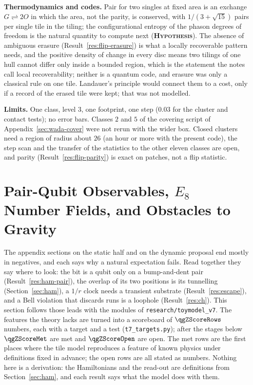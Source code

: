 \documentclass[11pt]{article}
\newcommand{\hypo}{\textbf{\textsc{Hypothesis}}}
\theoremstyle{definition}
\begin{document}
\textbf{Thermodynamics and codes.} Pair for two singles at fixed area is an exchange $G\rightleftharpoons 2O$ in which the area, not the parity, is conserved, with $1/(3+\sqrt{15})$ pairs per single tile in the tiling; the configurational entropy of the phason degrees of freedom is the natural quantity to compute next (\hypo). The absence of ambiguous erasure (Result~\ref{res:flip-erasure}) is what a locally recoverable pattern needs, and the positive density of change in every disc means two tilings of one hull cannot differ only inside a bounded region, which is the statement the notes call local recoverability; neither is a quantum code, and erasure was only a classical rule on one tile. Landauer's principle \cite{landauer1961} would connect them to a cost, only if a record of the erased tile were kept; that was not modelled.

\textbf{Limits.} One class, level $3$, one footprint, one step ($0.03$ for the cluster and contact tests); no error bars. Classes $2$ and $5$ of the covering script of Appendix~\ref{sec:wada-cover} were not rerun with the wider box. Closed clusters need a region of radius about $26$ (an hour or more with the present code), the step scan and the transfer of the statistics to the other eleven classes are open, and parity (Result~\ref{res:flip-parity}) is exact on patches, not a flip statistic.


\section{Pair-Qubit Observables, $E_8$ Number Fields, and Obstacles to Gravity}
\label{sec:toward}

The appendix sections on the static half and on the dynamic proposal end mostly in negatives, and each says why a natural expectation fails. Read together they say where to look: the bit is a qubit only on a bump-and-dent pair (Result~\ref{res:ham-pair}), the overlap of its two positions is its tunnelling (Section~\ref{sec:ham}), a $1/r$ clock needs a transient substrate (Result~\ref{res:escape}), and a Bell violation that discards runs is a loophole (Result~\ref{res:ch}). This section follows those leads with the modules of \texttt{research/toymodel\_v7}. The features the theory lacks are turned into a scoreboard of $\qgZScoreRows$ numbers, each with a target and a test (\texttt{t7\_targets.py}); after the stages below $\qgZScoreMet$ are met and $\qgZScoreOpen$ are open. The met rows are the first places where the tile model reproduces a feature of known physics under definitions fixed in advance; the open rows are all stated as numbers. Nothing here is a derivation: the Hamiltonians and the read-out are definitions from Section~\ref{sec:ham}, and each result says what the model does with them.
\end{document}
